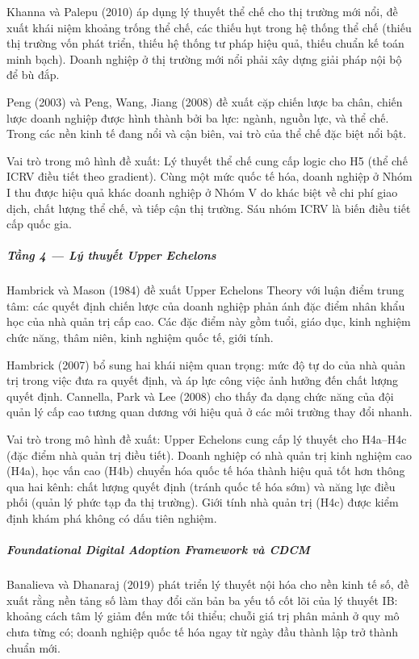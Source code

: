 \documentclass[12pt,a4paper]{article}
\begin{document}
Khanna và Palepu (2010) áp dụng lý thuyết thể chế cho thị trường mới
nổi, đề xuất khái niệm khoảng trống thể chế, các thiếu hụt trong hệ
thống thể chế (thiếu thị trường vốn phát triển, thiếu hệ thống tư pháp
hiệu quả, thiếu chuẩn kế toán minh bạch). Doanh nghiệp ở thị trường mới
nổi phải xây dựng giải pháp nội bộ để bù đắp.

Peng (2003) và Peng, Wang, Jiang (2008) đề xuất cặp chiến lược ba chân,
chiến lược doanh nghiệp được hình thành bởi ba lực: ngành, nguồn lực, và
thể chế. Trong các nền kinh tế đang nổi và cận biên, vai trò của thể chế
đặc biệt nổi bật.

Vai trò trong mô hình đề xuất: Lý thuyết thể chế cung cấp logic cho H5
(thể chế ICRV điều tiết theo gradient). Cùng một mức quốc tế hóa, doanh
nghiệp ở Nhóm I thu được hiệu quả khác doanh nghiệp ở Nhóm V do khác
biệt về chi phí giao dịch, chất lượng thể chế, và tiếp cận thị trường.
Sáu nhóm ICRV là biến điều tiết cấp quốc gia.

\hypertarget{tux1ea7ng-4--luxfd-thuyux1ebft-upper-echelons}{%
\subparagraph{Tầng 4 --- Lý thuyết Upper
Echelons}\label{tux1ea7ng-4--luxfd-thuyux1ebft-upper-echelons}}

Hambrick và Mason (1984) đề xuất Upper Echelons Theory với luận điểm
trung tâm: các quyết định chiến lược của doanh nghiệp phản ánh đặc điểm
nhân khẩu học của nhà quản trị cấp cao. Các đặc điểm này gồm tuổi, giáo
dục, kinh nghiệm chức năng, thâm niên, kinh nghiệm quốc tế, giới tính.

Hambrick (2007) bổ sung hai khái niệm quan trọng: mức độ tự do của nhà
quản trị trong việc đưa ra quyết định, và áp lực công việc ảnh hưởng đến
chất lượng quyết định. Cannella, Park và Lee (2008) cho thấy đa dạng
chức năng của đội quản lý cấp cao tương quan dương với hiệu quả ở các
môi trường thay đổi nhanh.

Vai trò trong mô hình đề xuất: Upper Echelons cung cấp lý thuyết cho
H4a--H4c (đặc điểm nhà quản trị điều tiết). Doanh nghiệp có nhà quản trị
kinh nghiệm cao (H4a), học vấn cao (H4b) chuyển hóa quốc tế hóa thành
hiệu quả tốt hơn thông qua hai kênh: chất lượng quyết định (tránh quốc
tế hóa sớm) và năng lực điều phối (quản lý phức tạp đa thị trường). Giới
tính nhà quản trị (H4c) được kiểm định khám phá không có dấu tiên
nghiệm.

\hypertarget{foundational-digital-adoption-framework-vuxe0-cdcm}{%
\subparagraph{Foundational Digital Adoption Framework và
CDCM}\label{foundational-digital-adoption-framework-vuxe0-cdcm}}

Banalieva và Dhanaraj (2019) phát triển lý thuyết nội hóa cho nền kinh
tế số, đề xuất rằng nền tảng số làm thay đổi căn bản ba yếu tố cốt lõi
của lý thuyết IB: khoảng cách tâm lý giảm đến mức tối thiểu; chuỗi giá
trị phân mảnh ở quy mô chưa từng có; doanh nghiệp quốc tế hóa ngay từ
ngày đầu thành lập trở thành chuẩn mới.
\end{document}
